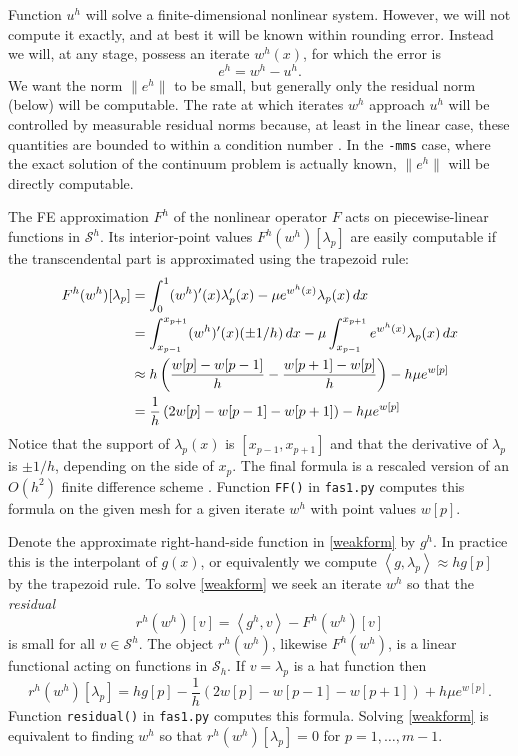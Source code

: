 \documentclass[letterpaper,final,12pt,reqno]{amsart}
\newcommand{\ip}[2]{\left<#1,#2\right>}
\begin{document}
Function $u^h$ will solve a finite-dimensional nonlinear system.  However, we will not compute it exactly, and at best it will be known within rounding error.  Instead we will, at any stage, possess an iterate $w^h(x)$, for which the error is
\begin{equation}
  e^h = w^h - u^h.  \label{feerror}
\end{equation}
We want the norm $\|e^h\|$ to be small, but generally only the residual norm (below) will be computable.  The rate at which iterates $w^h$ approach $u^h$ will be controlled by measurable residual norms because, at least in the linear case, these quantities are bounded to within a condition number \cite[Chapter 2]{Bueler2021}.  In the \texttt{-mms} case, where the exact solution of the continuum problem is actually known, $\|e^h\|$ will be directly computable.

The FE approximation $F^h$ of the nonlinear operator $F$ acts on piecewise-linear functions in $\mathcal{S}^h$.  Its interior-point values $F^h(w^h)[\lambda_p]$ are easily computable if the transcendental part is approximated using the trapezoid rule:
\begin{align}
  F^h(w^h)[\lambda_p] &= \int_0^1 (w^h)'(x) \lambda_p'(x) - \mu e^{w^h(x)} \lambda_p(x)\, dx  \label{feoperator} \\
    &= \int_{x_{p-1}}^{x_{p+1}} (w^h)'(x) (\pm 1/h)\,dx - \mu \int_{x_{p-1}}^{x_{p+1}} e^{w^h(x)} \lambda_p(x)\, dx \notag \\
    &\approx h \left(\frac{w[p]-w[p-1]}{h} - \frac{w[p+1]-w[p]}{h}\right) - h \mu e^{w[p]}  \notag \\
    &= \frac{1}{h}\left(2w[p]-w[p-1]-w[p+1]\right) - h \mu e^{w[p]} \notag
\end{align}
Notice that the support of $\lambda_p(x)$ is $[x_{p-1},x_{p+1}]$ and that the derivative of $\lambda_p$ is $\pm 1/h$, depending on the side of $x_p$.  The final formula is a rescaled version of an $O(h^2)$ finite difference scheme \cite[Chapter 3]{Bueler2021}.  Function \texttt{FF()} in \texttt{fas1.py} computes this formula on the given mesh for a given iterate $w^h$ with point values $w[p]$.

Denote the approximate right-hand-side function in \eqref{weakform} by $g^h$.  In practice this is the interpolant of $g(x)$, or equivalently we compute $\ip{g}{\lambda_p}\approx h g[p]$ by the trapezoid rule.   To solve \eqref{weakform} we seek an iterate $w^h$ so that the \emph{residual}
\begin{equation}
  r^h(w^h)[v] = \ip{g^h}{v} - F^h(w^h)[v]  \label{feresidual}
\end{equation}
is small for all $v\in \mathcal{S}^h$.  The object $r^h(w^h)$, likewise $F^h(w^h)$, is a linear functional acting on functions in $\mathcal{S}_h$.  If $v=\lambda_p$ is a hat function then
\begin{equation}
  r^h(w^h)[\lambda_p] = h g[p] - \frac{1}{h}\left(2w[p]-w[p-1]-w[p+1]\right) + h \mu e^{w[p]}.  \label{feresidualdetail}
\end{equation}
Function \texttt{residual()} in \texttt{fas1.py} computes this formula.  Solving \eqref{weakform} is equivalent to finding $w^h$ so that $r^h(w^h)[\lambda_p]=0$ for $p=1,\dots,m-1$.
\end{document}
